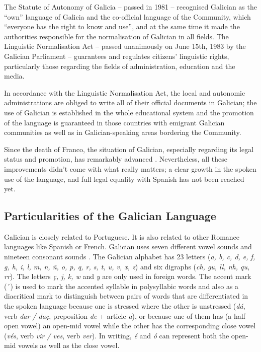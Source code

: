 \begin{multicols}{2}
The Statute of Autonomy of Galicia -- passed in 1981 -- recognised Galician as the “own” language of Galicia and the co-official language of the Community, which “everyone has the right to know and use”, and at the same time it made the authorities responsible for the normalisation of Galician in all fields. The Linguistic Normalisation Act -- passed unanimously on June 15th, 1983 by the Galician Parliament -- guarantees and regulates citizens’ linguistic rights, particularly those regarding the fields of administration, education and the media. 

In accordance with the Linguistic Normalisation Act, the local and autonomic administrations are obliged to write all of their official documents in Galician; the use of Galician is established in the whole educational system and the promotion of the language is guaranteed in those countries with emigrant Galician communities as well as in Galician-speaking areas bordering the Community. 


Since the death of Franco, the situation of Galician, especially regarding its legal status and promotion, has remarkably advanced \cite{GAL-Nota7}. Nevertheless, all these improvements didn't come with what really matters; a clear growth in the spoken use of the language, and full legal equality with Spanish has not been reached yet.

\subsection{Particularities of the Galician Language}

   Galician is closely related to Portuguese. It is also related to other Romance languages like Spanish or French. Galician uses seven different vowel sounds and nineteen consonant sounds . The Galician alphabet has 23 letters (\textit{a, b, c, d, e, f, g, h, i, l, m, n, ñ, o, p, q, r, s, t, u, v, x, z}) and six digraphs (\textit{ch, gu, ll, nh, qu, rr}). The letters \textit{ç, j, k, w} and \textit{y} are only used in foreign words. The accent mark (´) is used to mark the accented syllable in polysyllabic words and also as a diacritical mark to distinguish between pairs of words that are differentiated in the spoken language because one is stressed where the other is unstressed (\textit{dá}, verb \textit{dar / daç}, preposition \textit{de} + article \textit{a}), or because one of them has (a half open vowel) an open-mid vowel while the other has the corresponding close vowel (\textit{vés}, verb \textit{vir / ves}, verb \textit{ver}). In writing, \textit{é} and \textit{ó} can represent both the open-mid vowels as well as the close vowel.


\end{multicols}

